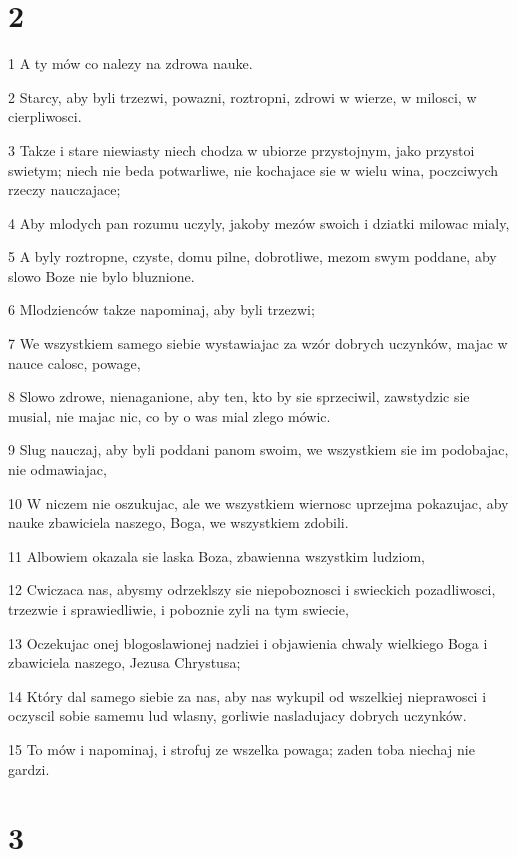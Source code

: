 \chapter{2}

\par 1 A ty mów co nalezy na zdrowa nauke.
\par 2 Starcy, aby byli trzezwi, powazni, roztropni, zdrowi w wierze, w milosci, w cierpliwosci.
\par 3 Takze i stare niewiasty niech chodza w ubiorze przystojnym, jako przystoi swietym; niech nie beda potwarliwe, nie kochajace sie w wielu wina, poczciwych rzeczy nauczajace;
\par 4 Aby mlodych pan rozumu uczyly, jakoby mezów swoich i dziatki milowac mialy,
\par 5 A byly roztropne, czyste, domu pilne, dobrotliwe, mezom swym poddane, aby slowo Boze nie bylo bluznione.
\par 6 Mlodzienców takze napominaj, aby byli trzezwi;
\par 7 We wszystkiem samego siebie wystawiajac za wzór dobrych uczynków, majac w nauce calosc, powage,
\par 8 Slowo zdrowe, nienaganione, aby ten, kto by sie sprzeciwil, zawstydzic sie musial, nie majac nic, co by o was mial zlego mówic.
\par 9 Slug nauczaj, aby byli poddani panom swoim, we wszystkiem sie im podobajac, nie odmawiajac,
\par 10 W niczem nie oszukujac, ale we wszystkiem wiernosc uprzejma pokazujac, aby nauke zbawiciela naszego, Boga, we wszystkiem zdobili.
\par 11 Albowiem okazala sie laska Boza, zbawienna wszystkim ludziom,
\par 12 Cwiczaca nas, abysmy odrzeklszy sie niepoboznosci i swieckich pozadliwosci, trzezwie i sprawiedliwie, i poboznie zyli na tym swiecie,
\par 13 Oczekujac onej blogoslawionej nadziei i objawienia chwaly wielkiego Boga i zbawiciela naszego, Jezusa Chrystusa;
\par 14 Który dal samego siebie za nas, aby nas wykupil od wszelkiej nieprawosci i oczyscil sobie samemu lud wlasny, gorliwie nasladujacy dobrych uczynków.
\par 15 To mów i napominaj, i strofuj ze wszelka powaga; zaden toba niechaj nie gardzi.

\chapter{3}

